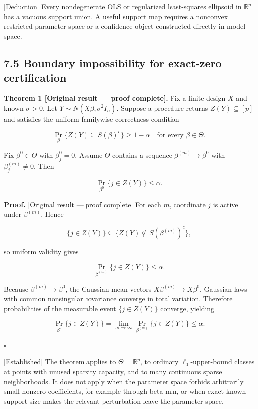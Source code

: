 \documentclass[
  english,
  11pt,
  a4paper,
]{article}
\begin{document}
{[}Deduction{]} Every nondegenerate OLS or regularized least-squares
ellipsoid in $\mathbb R^p$ has a vacuous support union. A useful
support map requires a nonconvex restricted parameter space or a
confidence object constructed directly in model space.

\subsection{7.5 Boundary impossibility for exact-zero
certification}\label{boundary-impossibility-for-exact-zero-certification}

\textbf{Theorem 1 {[}Original result --- proof complete{]}.} Fix a
finite design $X$ and known $\sigma>0$. Let
$Y\sim N(X\beta,\sigma^2I_n)$. Suppose a procedure returns
$Z(Y)\subseteq[p]$ and satisfies the uniform familywise correctness
condition

$$
\Pr_\beta\{Z(Y)\subseteq S(\beta)^c\}\ge1-\alpha
\quad\text{for every }\beta\in\Theta.
$$

Fix $\beta^0\in\Theta$ with $\beta_j^0=0$. Assume $\Theta$
contains a sequence $\beta^{(m)}\to\beta^0$ with
$\beta_j^{(m)}\ne0$. Then

$$
\Pr_{\beta^0}\{j\in Z(Y)\}\le\alpha.
$$

\textbf{Proof.} {[}Original result --- proof complete{]} For each $m$,
coordinate $j$ is active under $\beta^{(m)}$. Hence

$$
\{j\in Z(Y)\}
\subseteq
\{Z(Y)\not\subseteq S(\beta^{(m)})^c\},
$$

so uniform validity gives

$$
\Pr_{\beta^{(m)}}\{j\in Z(Y)\}\le\alpha.
$$

Because $\beta^{(m)}\to\beta^0$, the Gaussian mean vectors
$X\beta^{(m)}\to X\beta^0$. Gaussian laws with common nonsingular
covariance converge in total variation. Therefore probabilities of the
measurable event $\{j\in Z(Y)\}$ converge, yielding

$$
\Pr_{\beta^0}\{j\in Z(Y)\}
=
\lim_{m\to\infty}
\Pr_{\beta^{(m)}}\{j\in Z(Y)\}
\le\alpha.
$$

$\square$

{[}Established{]} The theorem applies to $\Theta=\mathbb R^p$, to
ordinary $\ell_0$-upper-bound classes at points with unused sparsity
capacity, and to many continuous sparse neighborhoods. It does not apply
when the parameter space forbids arbitrarily small nonzero coefficients,
for example through beta-min, or when exact known support size makes the
relevant perturbation leave the parameter space.
\end{document}
